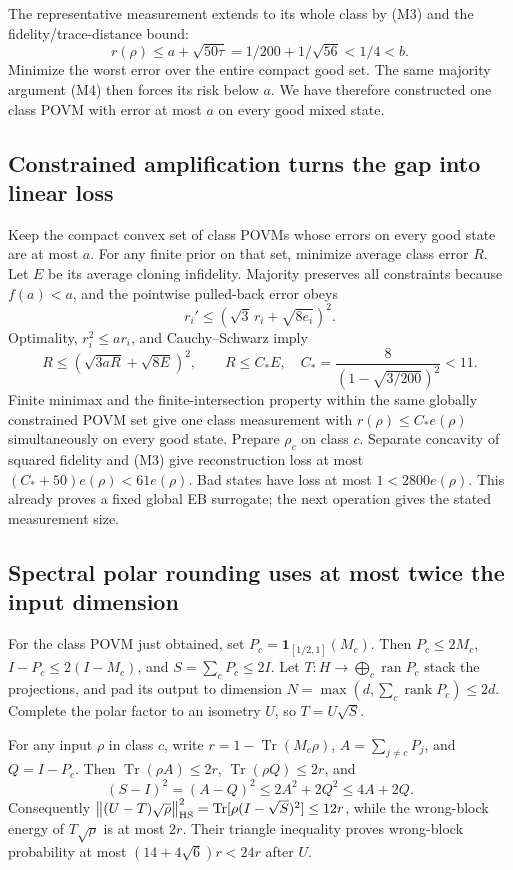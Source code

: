 \documentclass[11pt]{article}
\newcommand{\Tr}{\operatorname{Tr}}
\newcommand{\norm}[1]{\left\lVert#1\right\rVert}
\begin{document}
The representative measurement extends to its whole class by (M3) and the fidelity/trace-distance bound:
\[
r(\rho)\le a+\sqrt{50\tau}=1/200+1/\sqrt{56}<1/4<b.
\]
Minimize the worst error over the entire compact good set. The same majority argument (M4) then forces its risk below $a$. We have therefore constructed one class POVM with error at most $a$ on every good mixed state.

\subsection{Constrained amplification turns the gap into linear loss}

Keep the compact convex set of class POVMs whose errors on every good state are at most $a$. For any finite prior on that set, minimize average class error $R$. Let $E$ be its average cloning infidelity. Majority preserves all constraints because $f(a)<a$, and the pointwise pulled-back error obeys
\[
r_i'\le(\sqrt3\,r_i+\sqrt{8e_i})^2.
\]
Optimality, $r_i^2\le ar_i$, and Cauchy--Schwarz imply
\[
R\le(\sqrt{3aR}+\sqrt{8E})^2,
\qquad R\le C_*E,\quad C_*=\frac8{(1-\sqrt{3/200})^2}<11.
\tag{M7}
\]
Finite minimax and the finite-intersection property within the same globally constrained POVM set give one class measurement with $r(\rho)\le C_*e(\rho)$ simultaneously on every good state. Prepare $\rho_c$ on class $c$. Separate concavity of squared fidelity and (M3) give reconstruction loss at most $(C_*+50)e(\rho)<61e(\rho)$. Bad states have loss at most $1<2800e(\rho)$. This already proves a fixed global EB surrogate; the next operation gives the stated measurement size.

\subsection{Spectral polar rounding uses at most twice the input dimension}

For the class POVM just obtained, set $P_c=\mathbf1_{[1/2,1]}(M_c)$. Then $P_c\le2M_c$, $I-P_c\le2(I-M_c)$, and $S=\sum_cP_c\le2I$. Let $T:H\to\bigoplus_c\operatorname{ran}P_c$ stack the projections, and pad its output to dimension $N=\max(d,\sum_c\operatorname{rank}P_c)\le2d$. Complete the polar factor to an isometry $U$, so $T=U\sqrt S$.

For any input $\rho$ in class $c$, write $r=1-\Tr(M_c\rho)$, $A=\sum_{j\ne c}P_j$, and $Q=I-P_c$. Then $\Tr(\rho A)\le2r$, $\Tr(\rho Q)\le2r$, and
\[
(S-I)^2=(A-Q)^2\le2A^2+2Q^2\le4A+2Q.
\]
Consequently $\norm{(U-T)\sqrt\rho}_{\rm HS}^2=\Tr[\rho(I-\sqrt S)^2]\le12r$, while the wrong-block energy of $T\sqrt\rho$ is at most $2r$. Their triangle inequality proves wrong-block probability at most $(14+4\sqrt6)r<24r$ after $U$.
\end{document}
